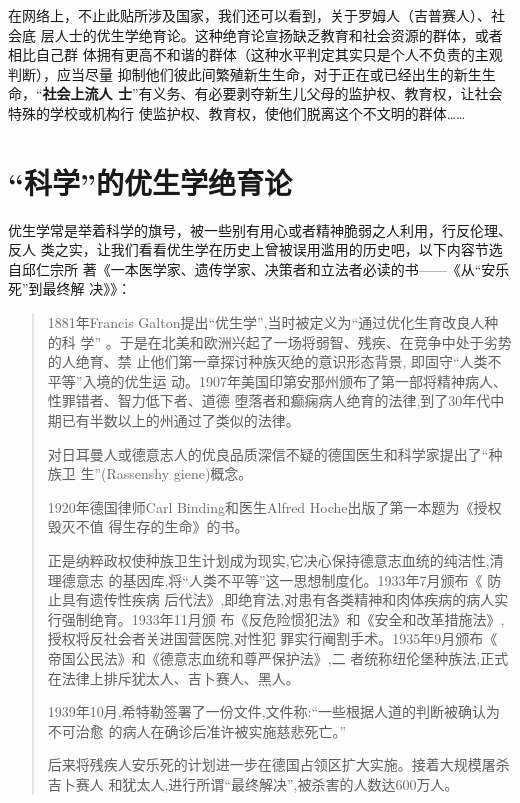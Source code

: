在网络上，不止此贴所涉及国家，我们还可以看到，关于罗姆人（吉普赛人）、社会底
层人士的优生学绝育论。这种绝育论宣扬缺乏教育和社会资源的群体，或者相比自己群
体拥有更高不和谐的群体（这种水平判定其实只是个人不负责的主观判断），应当尽量
抑制他们彼此间繁殖新生生命，对于正在或已经出生的新生生命，“\textbf{社会上流人
  士}”有义务、有必要剥夺新生儿父母的监护权、教育权，让社会特殊的学校或机构行
使监护权、教育权，使他们脱离这个不文明的群体……

\section{“科学”的优生学绝育论}

优生学常是举着科学的旗号，被一些别有用心或者精神脆弱之人利用，行反伦理、反人
类之实，让我们看看优生学在历史上曾被误用滥用的历史吧，以下内容节选自邱仁宗所
著《一本医学家、遗传学家、决策者和立法者必读的书——《从“安乐死”到最终解
决》》\cite{yousheng}：

\begin{quotation}
  1881年Francis Galton提出“优生学”,当时被定义为“通过优化生育改良人种的科
  学” 。于是在北美和欧洲兴起了一场将弱智、残疾、在竞争中处于劣势的人绝育、禁
  止他们第一章探讨种族灭绝的意识形态背景, 即固守“人类不平等”入境的优生运
  动。1907年美国印第安那州颁布了第一部将精神病人、性罪错者、智力低下者、道德
  堕落者和癫痫病人绝育的法律,到了30年代中期已有半数以上的州通过了类似的法律。

  对日耳曼人或德意志人的优良品质深信不疑的德国医生和科学家提出了“种族卫
  生”(Rassenshy giene)概念。

  1920年德国律师Carl Binding和医生Alfred Hoche出版了第一本题为《授权毁灭不值
  得生存的生命》的书。

  正是纳粹政权使种族卫生计划成为现实,它决心保持德意志血统的纯洁性,清理德意志
  的基因库,将“人类不平等”这一思想制度化。1933年7月颁布《 防止具有遗传性疾病
  后代法》,即绝育法,对患有各类精神和肉体疾病的病人实行强制绝育。1933年11月颁
  布《反危险惯犯法》和《安全和改革措施法》, 授权将反社会者关进国营医院,对性犯
  罪实行阉割手术。1935年9月颁布《 帝国公民法》和《德意志血统和尊严保护法》,二
  者统称纽伦堡种族法,正式在法律上排斥犹太人、吉卜赛人、黑人。

  1939年10月,希特勒签署了一份文件,文件称:“一些根据人道的判断被确认为不可治愈
  的病人在确诊后准许被实施慈悲死亡。”

  后来将残疾人安乐死的计划进一步在德国占领区扩大实施。接着大规模屠杀吉卜赛人
  和犹太人,进行所谓“最终解决”,被杀害的人数达600万人。
\end{quotation}

